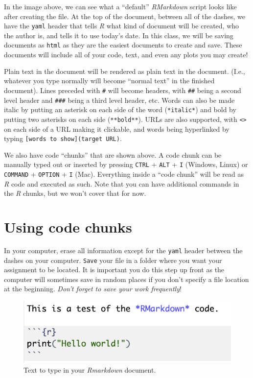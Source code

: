 \documentclass[
  letterpaper,
  DIV=11,
  numbers=noendperiod]{scrreprt}
\begin{document}
In the image above, we can see what a ``default'' \emph{RMarkdown}
script looks like after creating the file. At the top of the document,
between all of the dashes, we have the \texttt{yaml} header that tells
\emph{R} what kind of document will be created, who the author is, and
tells it to use today's date. In this class, we will be saving documents
as \texttt{html} as they are the easiest documents to create and save.
These documents will include all of your code, text, and even any plots
you may create!

Plain text in the document will be rendered as plain text in the
document. (I.e., whatever you type normally will become ``normal text''
in the finished document). Lines preceded with \texttt{\#} will become
headers, with \texttt{\#\#} being a second level header and
\texttt{\#\#\#} being a third level header, etc. Words can also be made
italic by putting an asterisk on each side of the word
(\texttt{*italic*}) and bold by putting two asterisks on each side
(\texttt{**bold**}). URLs are also supported, with
\texttt{\textless{}\textgreater{}} on each side of a URL making it
clickable, and words being hyperlinked by typing
\texttt{{[}words\ to\ show{]}(target\ URL)}.

We also have code ``chunks'' that are shown above. A code chunk can be
manually typed out or inserted by pressing \texttt{CTRL} + \texttt{ALT}
+ \texttt{I} (Windows, Linux) or \texttt{COMMAND} + \texttt{OPTION} +
\texttt{I} (Mac). Everything inside a ``code chunk'' will be read as
\emph{R} code and executed as such. Note that you can have additional
commands in the \emph{R} chunks, but we won't cover that for now.

\section{Using code chunks}\label{using-code-chunks}

In your computer, erase all information except for the \texttt{yaml}
header between the dashes on your computer. \texttt{Save} your file in a
folder where you want your assignment to be located. It is important you
do this step up front as the computer will sometimes save in random
places if you don't specify a file location at the beginning.
\emph{Don't forget to save your work frequently}!

\begin{figure}[H]

{\centering \includegraphics{images/test_text.png}

}

\caption{Text to type in your \emph{Rmarkdown} document.}

\end{figure}%
\end{document}
